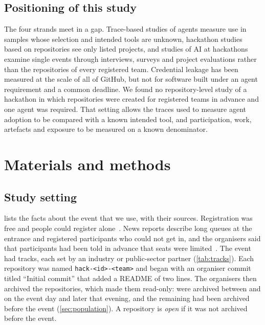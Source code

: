 \documentclass{article}
\begin{document}
\subsection{Positioning of this study}
The four strands meet in a gap. Trace-based studies of agents measure use in samples whose selection and intended tools are unknown, hackathon studies based on repositories see only listed projects, and studies of AI at hackathons examine single events through interviews, surveys and project evaluations rather than the repositories of every registered team. Credential leakage has been measured at the scale of all of GitHub, but not for software built under an agent requirement and a common deadline. We found no repository-level study of a hackathon in which repositories were created for registered teams in advance and one agent was required. That setting allows the traces used to measure agent adoption to be compared with a known intended tool, and participation, work, artefacts and exposure to be measured on a known denominator.

\section{Materials and methods}\label{sec:methods}

\subsection{Study setting}\label{sec:event}

 lists the facts about the event that we use, with their sources. Registration was free and people could register alone~\cite{hackalem2026site}. News reports describe long queues at the entrance and registered participants who could not get in, and the organisers said that participants had been told in advance that seats were limited~\cite{qumash2026queue,ulys2026survival}. The event had \NTracksCount{} tracks, each set by an industry or public-sector partner (\cref{tab:tracks}). Each repository was named \texttt{hack-<id>-<team>} and began with an organiser commit titled ``Initial commit'' that added a README of two lines. The organisers then archived the repositories, which made them read-only: \NValidationArchiveWaveN{} were archived between \NValidationArchiveWaveFirst{} and \NValidationArchiveWaveLast{} on the event day and \NValidationArchiveLaterN{} later that evening, and the remaining \NRqOnePrearchivedN{} had been archived before the event (\cref{sec:population}). A repository is \emph{open} if it was not archived before the event.
\end{document}
